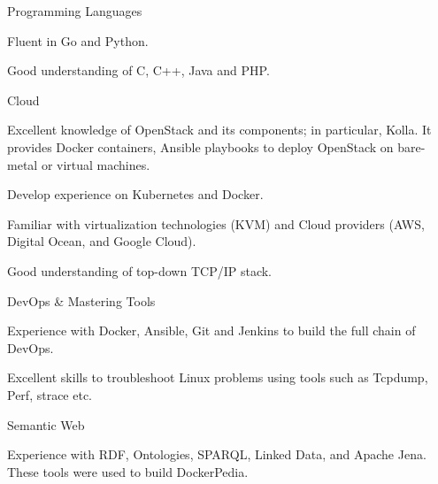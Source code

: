 \begin{cventries}
  \cventry
  {Programming Languages}
  {}
  {}
  {}
  {
    \begin{cvitems}
      \item {Fluent in Go and Python.}
      \item {Good understanding of C, C++, Java and PHP.}
    \end{cvitems}
  }

  \cventry
  {Cloud}
  {}
  {}
  {}
  {
    \begin{cvitems}
      \item {Excellent knowledge of OpenStack and its components; in
                  particular, Kolla. It provides Docker containers, Ansible
                  playbooks to deploy
                  OpenStack on bare-metal or virtual machines.}
      \item {Develop experience on Kubernetes and Docker.}
      \item {Familiar with virtualization technologies (KVM) and Cloud
                  providers (AWS, Digital Ocean, and Google Cloud).}
      \item {Good understanding of top-down TCP/IP stack.}
    \end{cvitems}
  }

  \cventry
  {DevOps \& Mastering Tools}
  {}
  {}
  {}
  {
    \begin{cvitems}
      \item {Experience with Docker, Ansible, Git and Jenkins to build the
                  full chain of DevOps.}
      \item {Excellent skills to troubleshoot Linux problems using tools such
                  as Tcpdump, Perf, strace etc.}
    \end{cvitems}
  }

  \cventry
  {Semantic Web}
  {}
  {}
  {}
  {
    \begin{cvitems}
      \item {Experience with RDF, Ontologies, SPARQL, Linked Data, and Apache
                  Jena. These tools were used to build DockerPedia.}
    \end{cvitems}
  }

\end{cventries}